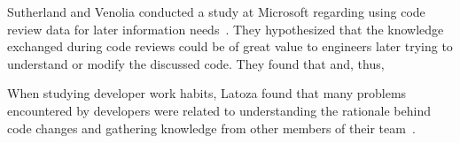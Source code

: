 Sutherland and Venolia conducted a study at Microsoft regarding using code
review data for later information needs~\cite{sutherland2009can}. They
hypothesized that the knowledge exchanged during code reviews could be of great
value to engineers later trying to understand or modify the discussed code.
They found that  and, thus, 

When studying developer work habits, Latoza \etal found that many problems
encountered by developers were related to understanding the rationale behind
code changes and gathering knowledge from other members of their team~\cite{latoza2006maintaining}.